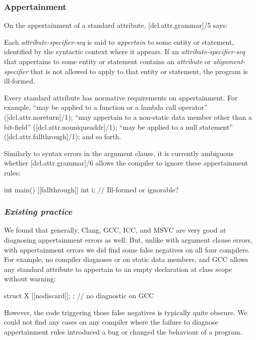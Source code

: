 \subsubsection{Appertainment}
\label{subsubsec:appertainment}

On the appertainment of a standard attribute, [dcl.attr.grammar]/5 says:

\begin{adjustwidth}{0.5cm}{0.5cm}
Each \emph{attribute-specifier-seq} is said to \emph{appertain} to some entity or statement, identified by the syntactic context where it appears. If an \emph{attribute-specifier-seq} that appertains to some entity or statement contains an \emph{attribute} or \emph{alignment-specifier} that is not allowed to apply to that entity or statement, the program is ill-formed.
\end{adjustwidth}

Every standard attribute has normative requirements on appertainment. For example,  ``may be applied to a function or a lambda call operator'' ([dcl.attr.noreturn]/1); \mbox{} ``may appertain to a non-static data member other than a bit-field'' ([dcl.attr.nouniqueaddr]/1);  ``may be applied to a null statement'' ([dcl.attr.fallthrough]/1); and so forth.

Similarly to syntax errors in the argument clause, it is currently ambiguous whether [dcl.attr.grammar]/6 allows the compiler to ignore these appertainment rules:

\begin{codeblock}
int main() {
  [[fallthrough]] int i;  // Ill-formed or ignorable?
}
\end{codeblock}

\subsubsection*{\emph{Existing practice}}

We found that generally, Clang, GCC, ICC, and MSVC are very good at diagnosing appertainment errors as well. But, unlike with argument clause errors, with appertainment errors we did find some false negatives on all four compilers. For example, no compiler diagnoses \tcode{[[deprecated]]} or  on static data members, and GCC allows any standard attribute to appertain to an empty declaration at class scope without warning:
\begin{codeblock}
struct X { [[nodiscard]]; };  // no diagnostic on GCC
\end{codeblock}
However, the code triggering those false negatives is typically quite obscure. We could not find any cases on any compiler where the failure to diagnose appertainment rules introduced a bug or changed the behaviour of a program.

